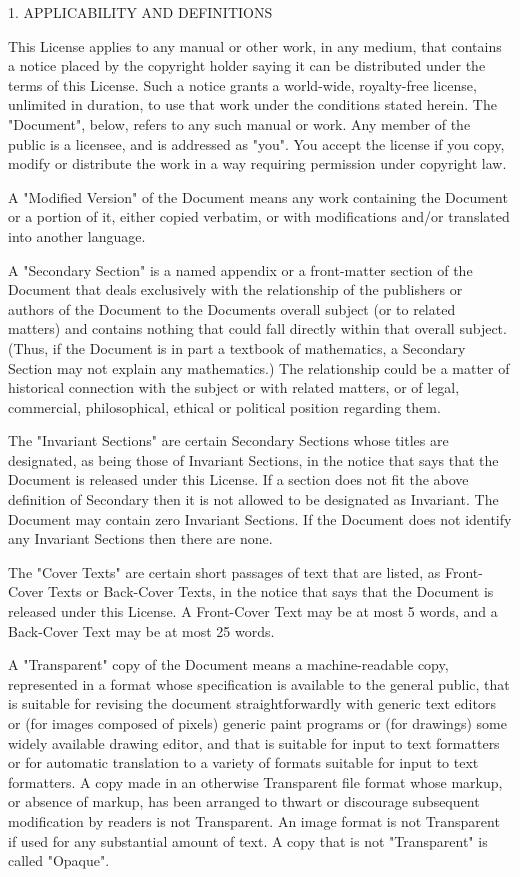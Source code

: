 \documentclass[
  english,
  11pt,
  a4paper,
]{article}
\begin{document}
1. APPLICABILITY AND DEFINITIONS

This License applies to any manual or other work, in any medium, that
contains a notice placed by the copyright holder saying it can be
distributed under the terms of this License. Such a notice grants a
world-wide, royalty-free license, unlimited in duration, to use that
work under the conditions stated herein. The "Document", below, refers
to any such manual or work. Any member of the public is a licensee, and
is addressed as "you". You accept the license if you copy, modify or
distribute the work in a way requiring permission under copyright law.

A "Modified Version" of the Document means any work containing the
Document or a portion of it, either copied verbatim, or with
modifications and/or translated into another language.

A "Secondary Section" is a named appendix or a front-matter section of
the Document that deals exclusively with the relationship of the
publishers or authors of the Document to the Document\textquotesingle s
overall subject (or to related matters) and contains nothing that could
fall directly within that overall subject. (Thus, if the Document is in
part a textbook of mathematics, a Secondary Section may not explain any
mathematics.) The relationship could be a matter of historical
connection with the subject or with related matters, or of legal,
commercial, philosophical, ethical or political position regarding them.

The "Invariant Sections" are certain Secondary Sections whose titles are
designated, as being those of Invariant Sections, in the notice that
says that the Document is released under this License. If a section does
not fit the above definition of Secondary then it is not allowed to be
designated as Invariant. The Document may contain zero Invariant
Sections. If the Document does not identify any Invariant Sections then
there are none.

The "Cover Texts" are certain short passages of text that are listed, as
Front-Cover Texts or Back-Cover Texts, in the notice that says that the
Document is released under this License. A Front-Cover Text may be at
most 5 words, and a Back-Cover Text may be at most 25 words.

A "Transparent" copy of the Document means a machine-readable copy,
represented in a format whose specification is available to the general
public, that is suitable for revising the document straightforwardly
with generic text editors or (for images composed of pixels) generic
paint programs or (for drawings) some widely available drawing editor,
and that is suitable for input to text formatters or for automatic
translation to a variety of formats suitable for input to text
formatters. A copy made in an otherwise Transparent file format whose
markup, or absence of markup, has been arranged to thwart or discourage
subsequent modification by readers is not Transparent. An image format
is not Transparent if used for any substantial amount of text. A copy
that is not "Transparent" is called "Opaque".
\end{document}
